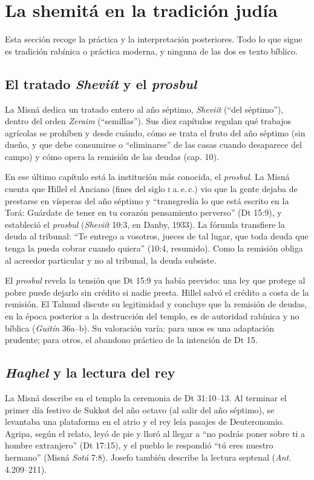 \documentclass[11pt,letterpaper]{article}
\begin{document}
\section{La shemitá en la tradición judía}

Esta sección recoge la práctica y la interpretación posteriores. Todo lo que sigue es tradición rabínica o práctica moderna, y ninguna de las dos es texto bíblico.

\subsection{El tratado \emph{Sheviít} y el \emph{prosbul}}
La Misná dedica un tratado entero al año séptimo, \emph{Sheviít} (``del séptimo''), dentro del orden \emph{Zeraim} (``semillas''). Sus diez capítulos regulan qué trabajos agrícolas se prohíben y desde cuándo, cómo se trata el fruto del año séptimo (sin dueño, y que debe consumirse o ``eliminarse'' de las casas cuando desaparece del campo) y cómo opera la remisión de las deudas (cap. 10).

En ese último capítulo está la institución más conocida, el \emph{prosbul}. La Misná cuenta que Hillel el Anciano (fines del siglo \textsc{i} a.\,e.\,c.) vio que la gente dejaba de prestarse en vísperas del año séptimo y ``transgredía lo que está escrito en la Torá: Guárdate de tener en tu corazón pensamiento perverso'' (Dt 15:9), y estableció el \emph{prosbul} (\emph{Sheviít} 10:3, en Danby, 1933). La fórmula transfiere la deuda al tribunal: ``Te entrego a vosotros, jueces de tal lugar, que toda deuda que tenga la pueda cobrar cuando quiera'' (10:4, resumido). Como la remisión obliga al acreedor particular y no al tribunal, la deuda subsiste.

\begin{nota}[Precisión]
El \emph{prosbul} revela la tensión que Dt 15:9 ya había previsto: una ley que protege al pobre puede dejarlo sin crédito si nadie presta. Hillel salvó el crédito a costa de la remisión. El Talmud discute su legitimidad y concluye que la remisión de deudas, en la época posterior a la destrucción del templo, es de autoridad rabínica y no bíblica (\emph{Guitín} 36a--b). Su valoración varía: para unos es una adaptación prudente; para otros, el abandono práctico de la intención de Dt 15.
\end{nota}

\subsection{\emph{Haqhel} y la lectura del rey}
La Misná describe en el templo la ceremonia de Dt 31:10--13. Al terminar el primer día festivo de Sukkot del año octavo (al salir del año séptimo), se levantaba una plataforma en el atrio y el rey leía pasajes de Deuteronomio. Agripa, según el relato, leyó de pie y lloró al llegar a ``no podrás poner sobre ti a hombre extranjero'' (Dt 17:15), y el pueblo le respondió ``tú eres nuestro hermano'' (Misná \emph{Sotá} 7:8). Josefo también describe la lectura septenal (\emph{Ant.} 4.209--211).
\end{document}
